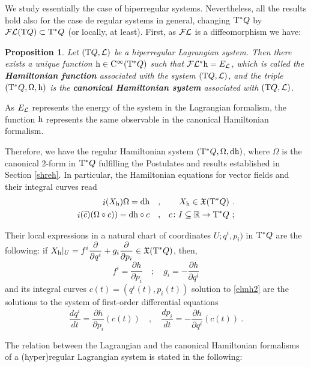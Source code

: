 \documentclass[12pt]{report}
\newtheorem{prop}[teor]{Proposition}
\def\beq{\begin{equation}}
\def\eeq{\end{equation}}
\def\bea{\begin{eqnarray}}
\def\eea{\end{eqnarray}}
\def\derpar#1#2{\frac{\partial{#1}}{\partial{#2}}}
\def\vf{\mathfrak X}
\def\Lag{{\cal L}}
\def\d{{\rm d}}
\def\Real{\mathbb{R}}
\def\Tan{{\rm T}}
\def\inn{\mathop{i}\nolimits}
\def\Cinfty{{\rm C}^\infty}
\def\Leg{{\cal F}\Lag}
\begin{document}
We study essentially the case of hiperregular systems.
Nevertheless, all the results hold also for the case de
regular systems in general,
changing $\Tan^*Q$ by $\Leg (\Tan Q)\subset\Tan^*Q$
(or locally, at least).
First, as $\Leg$ is a diffeomorphism we have:

\begin{prop}
Let $(\Tan Q,\Lag)$ be a hiperregular Lagrangian system.
Then there exists a unique function ${\rm h}\in\Cinfty (\Tan^*Q)$ such that
$\Leg^*{\rm h}=E_\Lag$,
which is called the \textbf{Hamiltonian function} associated with the system
$(\Tan Q,\Lag)$,
and the triple $(\Tan^*Q,\Omega,{\rm h})$ is the 
\textbf{canonical Hamiltonian system} associated with $(\Tan Q,\Lag)$.
\end{prop}

As $E_\Lag$ represents the energy
of the system in the Lagrangian formalism, the function ${\rm h}$
represents the same observable in the canonical Hamiltonian formalism.

Therefore, we have the regular Hamiltonian system
$(\Tan^*Q,\Omega,\d {\rm h})$, where $\Omega$ is the canonical $2$-form in
$\Tan^*Q$
fulfilling the Postulates and results established in Section \ref{shreh}.
In particular, the Hamiltonian equations for vector fields and their
integral curves read
\bea
\inn(X_{\rm h})\Omega=\d {\rm h} \quad &,& \quad X_{\rm h}\in\vf(\Tan^* Q) \ .
\label{elmh} \\
\inn(\widetilde c)(\Omega\circ c))=\d {\rm h}\circ c \quad &,& c\colon I\subseteq\Real\to\Tan^* Q \ ;
\label{elmh2}
\eea

Their local expressions in a natural chart of coordinates
$U;q^i,p_i)$ in $\Tan^*Q$ are the following:
if $\displaystyle X_{\rm h}\vert_U=f^i\derpar{}{q^i}+g_i\derpar{}{p_i}\in\vf (\Tan^*Q)$,
then,
$$
f^i= \derpar{h}{p_i} \quad ; \quad g_i=-\derpar{h}{q^i}
$$
and its integral curves $c(t)=(q^i(t),p_i(t))$ solution to  \eqref{elmh2} are
the solutions to the system of first-order differential equations
\beq
\frac{d q^i}{d t} = \derpar{h}{p_i}(c(t))
\quad , \quad
\frac{d p_i}{d t} = -\derpar{h}{q^i}(c(t)) \ .
\label{hameq3}
\eeq

The relation between the Lagrangian and the canonical Hamiltonian formalisms of a (hyper)regular Lagrangian system is stated in the following:
\end{document}
